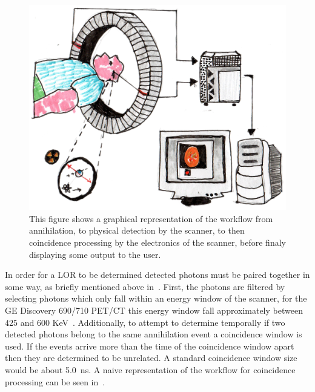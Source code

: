                 \begin{figure}
                    \centering
                    
                    \includegraphics[width=1.0\linewidth]{figures/background_coincidence_processing.png}
                    
                    \captionsetup{singlelinecheck=false, justification=raggedright}
                    \caption{This figure shows a graphical representation of the workflow from annihilation, to physical detection by the scanner, to then coincidence processing by the electronics of the scanner, before finaly displaying some output to the user.} \label{fig:coincidence_processing_coincidence_processing}
                \end{figure}
                
                In order for a \gls{LOR} to be determined detected photons must be paired together in some way, as briefly mentioned above in~. First, the photons are filtered by selecting photons which only fall within an energy window of the scanner, for the \gls{GE} Discovery 690/710 \gls{PET}/\gls{CT} this energy window fall approximately between $425$ and $600$ \gls{KeV}~. Additionally, to attempt to determine temporally if two detected photons belong to the same annihilation event a coincidence window is used. If the events arrive more than the time of the coincidence window apart then they are determined to be unrelated. A standard coincidence window size would be about \SI{5.0}{\nano\second}. A naive representation of the workflow for coincidence processing can be seen in~.
            
